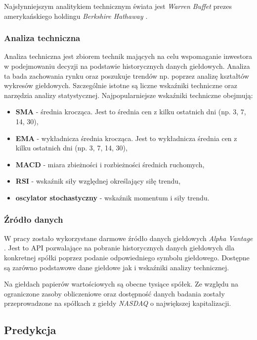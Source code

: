 \documentclass[a4paper, twoside, 11pt, openright]{article}
\begin{document}
Najsłynniejszym analitykiem technicznym świata jest \textit{Warren Buffet} prezes amerykańskiego holdingu \textit{Berkshire Hathaway \cite{berkeshire}}. 

\subsubsection{Analiza techniczna \cite{technicalanalysis}}

Analiza techniczna jest zbiorem technik mających na celu wspomaganie inwestora w podejmowaniu decyzji na podstawie historycznych danych giełdowych. Analiza ta bada zachowania rynku oraz poszukuje trendów np. poprzez analizę kształtów wykresów giełdowych. Szczególnie istotne są liczne wskaźniki techniczne oraz narzędzia analizy statystycznej.
Najpopularniejsze wskaźniki techniczne obejmują:
\begin{itemize}
\item{\textbf{SMA}} - średnia krocząca. Jest to średnia cen z kilku ostatnich dni (np. 3, 7, 14, 30),
\item{\textbf{EMA}} - wykładnicza średnia krocząca. Jest to wykładnicza średnia cen z kilku ostatnich dni (np. 3, 7, 14, 30),
\item{\textbf{MACD}} -  miara zbieżności i rozbieżności średnich ruchomych,
\item{\textbf{RSI}} -  wskaźnik siły względnej określający siłę trendu,
\item{\textbf{oscylator stochastyczny}} -  wskaźnik momentum i siły trendu.
\end{itemize}

\subsubsection{Źródło danych}

W pracy zostało wykorzystane darmowe źródło danych giełdowych \textit{Alpha Vantage} \cite{alphavantage}. Jest to API pozwalające na pobranie historycznych danych giełdowych dla konkretnej spółki poprzez podanie odpowiedniego symbolu giełdowego. Dostępne są zarówno podstawowe dane giełdowe jak i wskaźniki analizy technicznej. 

\bigskip

Na giełdach papierów wartościowych są obecne tysiące spółek. Ze względu na ograniczone zasoby obliczeniowe oraz dostępność danych badania zostały przeprowadzone na spółkach z giełdy \textit{NASDAQ} o największej kapitalizacji.

\subsection{Predykcja}
\end{document}
